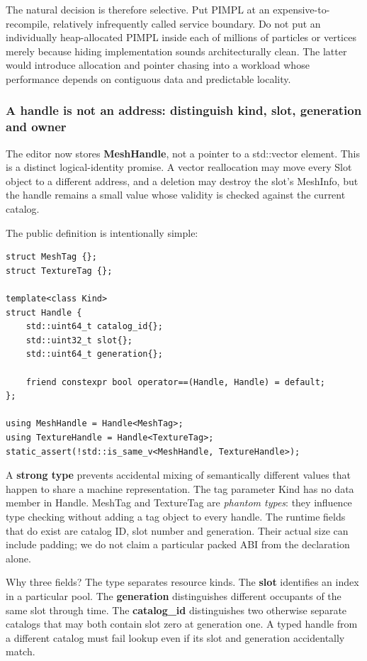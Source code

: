 The natural decision is therefore selective. Put PIMPL at an expensive-to-recompile, relatively infrequently called service boundary. Do not put an individually heap-allocated PIMPL inside each of millions of particles or vertices merely because hiding implementation sounds architecturally clean. The latter would introduce allocation and pointer chasing into a workload whose performance depends on contiguous data and predictable locality.

\subsubsection{A handle is not an address: distinguish kind, slot, generation and owner}\label{a-handle-is-not-an-address-distinguish-kind-slot-generation-and-owner}

The editor now stores \textbf{MeshHandle}, not a pointer to a std::vector element. This is a distinct logical-identity promise. A vector reallocation may move every Slot object to a different address, and a deletion may destroy the slot's MeshInfo, but the handle remains a small value whose validity is checked against the current catalog.

The public definition is intentionally simple:

\begin{verbatim}
struct MeshTag {};
struct TextureTag {};

template<class Kind>
struct Handle {
    std::uint64_t catalog_id{};
    std::uint32_t slot{};
    std::uint64_t generation{};

    friend constexpr bool operator==(Handle, Handle) = default;
};

using MeshHandle = Handle<MeshTag>;
using TextureHandle = Handle<TextureTag>;
static_assert(!std::is_same_v<MeshHandle, TextureHandle>);
\end{verbatim}

A \textbf{strong type} prevents accidental mixing of semantically different values that happen to share a machine representation. The tag parameter Kind has no data member in Handle. MeshTag and TextureTag are \emph{phantom types}: they influence type checking without adding a tag object to every handle. The runtime fields that do exist are catalog ID, slot number and generation. Their actual size can include padding; we do not claim a particular packed ABI from the declaration alone.

Why three fields? The type separates resource kinds. The \textbf{slot} identifies an index in a particular pool. The \textbf{generation} distinguishes different occupants of the same slot through time. The \textbf{catalog\_id} distinguishes two otherwise separate catalogs that may both contain slot zero at generation one. A typed handle from a different catalog must fail lookup even if its slot and generation accidentally match.

